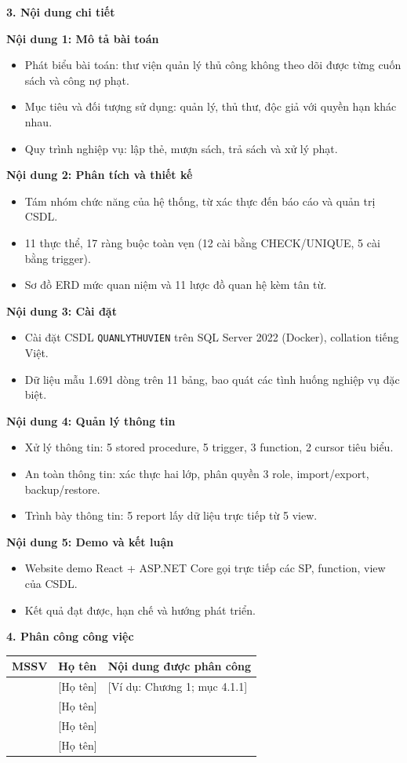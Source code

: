 \documentclass[a4paper,oneside]{report}
\begin{document}
\textbf{3. Nội dung chi tiết}

\textbf{Nội dung 1: Mô tả bài toán}
\begin{itemize}[label=+]
\item Phát biểu bài toán: thư viện quản lý thủ công không theo dõi được từng cuốn sách và công nợ phạt.
\item Mục tiêu và đối tượng sử dụng: quản lý, thủ thư, độc giả với quyền hạn khác nhau.
\item Quy trình nghiệp vụ: lập thẻ, mượn sách, trả sách và xử lý phạt.
\end{itemize}
\textbf{Nội dung 2: Phân tích và thiết kế}
\begin{itemize}[label=+]
\item Tám nhóm chức năng của hệ thống, từ xác thực đến báo cáo và quản trị CSDL.
\item 11 thực thể, 17 ràng buộc toàn vẹn (12 cài bằng CHECK/UNIQUE, 5 cài bằng trigger).
\item Sơ đồ ERD mức quan niệm và 11 lược đồ quan hệ kèm tân từ.
\end{itemize}
\textbf{Nội dung 3: Cài đặt}
\begin{itemize}[label=+]
\item Cài đặt CSDL \texttt{QUANLYTHUVIEN} trên SQL Server 2022 (Docker), collation tiếng Việt.
\item Dữ liệu mẫu 1.691 dòng trên 11 bảng, bao quát các tình huống nghiệp vụ đặc biệt.
\end{itemize}
\textbf{Nội dung 4: Quản lý thông tin}
\begin{itemize}[label=+]
\item Xử lý thông tin: 5 stored procedure, 5 trigger, 3 function, 2 cursor tiêu biểu.
\item An toàn thông tin: xác thực hai lớp, phân quyền 3 role, import/export, backup/restore.
\item Trình bày thông tin: 5 report lấy dữ liệu trực tiếp từ 5 view.
\end{itemize}
\textbf{Nội dung 5: Demo và kết luận}
\begin{itemize}[label=+]
\item Website demo React + ASP.NET Core gọi trực tiếp các SP, function, view của CSDL.
\item Kết quả đạt được, hạn chế và hướng phát triển.
\end{itemize}

\textbf{4. Phân công công việc}
\begin{center}
\begin{tabularx}{0.95\linewidth}{|>{\centering}p{2.6cm}|>{\raggedright}p{4.2cm}|L|}
\hline
\textbf{MSSV} & \textbf{Họ tên} & \textbf{Nội dung được phân công}\\\hline
[MSSV] & [Họ tên] & [Ví dụ: Chương 1; mục 4.1.1]\\\hline
[MSSV] & [Họ tên] & \\\hline
[MSSV] & [Họ tên] & \\\hline
[MSSV] & [Họ tên] & \\\hline
\end{tabularx}
\end{center}
\end{document}
